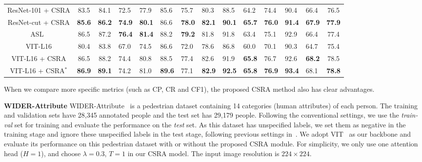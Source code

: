 \documentclass[10pt,twocolumn,letterpaper]{article}
\begin{document}
\begin{table*}
\begin{tabular}{c|c|clllll | lllllc}
		ResNet-101 + CSRA          & 83.5          & 84.1                     & 72.5                      & 77.9          & 85.6          & 75.7          & 80.3          & 88.5          & 64.2          & 74.4          & 90.4          & 66.4          & 76.5          \\
		ResNet-cut + CSRA          & \textbf{85.6} & \textbf{86.2}            & \textbf{74.9}             & \textbf{80.1} & 86.6          & \textbf{78.0} & \textbf{82.1} & \textbf{90.1} & \textbf{65.7} & \textbf{76.0} & \textbf{91.4} & \textbf{67.9} & \textbf{77.9} \\
		\hline\hline
		ASL~\cite{ASL_2020_arxiv}    & 86.5          & 87.2                     & \textbf{76.4}            & \textbf{81.4}     & 88.2       & \textbf{79.2}          & 81.8          & 91.8          & 63.4          & 75.1          & 92.9       & 66.4          & 77.4          \\
		VIT-L16                      & 80.4          & 83.8                     & 67.0                      & 74.5          & 86.6          & 72.0          & 78.6          & 86.8          & 60.0          & 70.1          & 90.3          & 64.7          & 75.4          \\
		VIT-L16 + CSRA           & 86.5 & 88.2            & 74.4                      & 80.8          & 88.5 & 77.4          & 82.6 & 91.9 & \textbf{65.8} & 76.7 & 92.6          & \textbf{68.2} & 78.5 \\
		VIT-L16 + CSRA$^*$           & \textbf{86.9} & \textbf{89.1}            & 74.2                      & 81.0          & \textbf{89.6} & 77.1          & \textbf{82.9} & \textbf{92.5} & \textbf{65.8} & \textbf{76.9} & \textbf{93.4}          & 68.1 & \textbf{78.8} \\\hline
	\end{tabular}
\end{table*}

When we compare more specific metrics (such as CP, CR and CF1), the proposed CSRA method also has clear advantages.

\vspace{6pt}\noindent\textbf{WIDER-Attribute} WIDER-Attribute~\cite{Wider} is a pedestrian dataset containing 14 categories (human attributes) of each person. The training and validation sets have 28,345 annotated people and the test set has 29,179 people. Following the conventional settings, we use the \emph{train-val} set for training and evaluate the performance on the \emph{test} set. As this dataset has unspecified labels, we set them as negative in the training stage and ignore these unspecified labels in the test stage, following previous settings in~\cite{2017_CVPR_SRN}. We adopt VIT~\cite{VIT} as our backbone and evaluate its performance on this pedestrian dataset with or without the proposed CSRA module. For simplicity, we only use one attention head ($H=1$), and choose $\lambda=0.3$, $T=1$ in our CSRA model. The input image resolution is $224\times224$.
\end{document}
